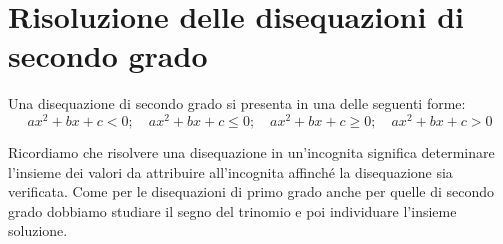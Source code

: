 \section{Risoluzione delle disequazioni di secondo grado}
\label{sec:diseq_secondo_grado}

Una disequazione di secondo grado si presenta in una delle seguenti forme:
\[ax^2+bx+c<0;\quad ax^2+bx+c\le 0;\quad ax^2+bx+c\ge0;\quad ax^2+bx+c> 0\]

Ricordiamo che risolvere una disequazione in un'incognita significa 
determinare l'insieme dei valori da attribuire all'incognita affinché la 
disequazione sia verificata.
Come per le disequazioni di primo grado anche per quelle di secondo grado
dobbiamo studiare il segno del trinomio e poi individuare l'insieme soluzione.

\begin{comment}

\subsection{Studio del segno di un trinomio di secondo grado}
\label{sec:diseq_trinomio}

Per studiare il segno di un polinomio di secondo grado seguiamo un 
procedimento in due passi:

\begin{enumerate}
 \item Equazione associata
Risolvendo l'equazione associata al polinomio troviamo gli zeri della 
funzione cioè i punti in cui il grafico della funzione incontra l'asse~x. 

A seconda del valore del discriminante l'equazione può avere 
nessuna soluzione reale (\(\Delta<0\)), 
soluzioni reali coincidenti (\(\Delta=0\)), 
soluzioni reali distinte (\(\Delta>0\)).

 \item Grafico della funzione associata
Disegnando il grafico della funzione associata al polinomio si individuano 
gli intervalli in cui il polinomio è positivo, il grafico è sopra l'asse~x 
o negativo, il grafico è sotto l'asse~x.

Se il coefficiente del termine di secondo grado è minore di zero (\(a<0\)) 
la parabola ha la concavità rivolta verso il basso, se è maggiore di zero 
(\(a>0\)) la parabola ha la concavità rivolta verso l'alto. 
\end{enumerate}

\begin{esempio}
Studiare i segno del polinomio: \(x^2-2x-3\)


\end{comment}
